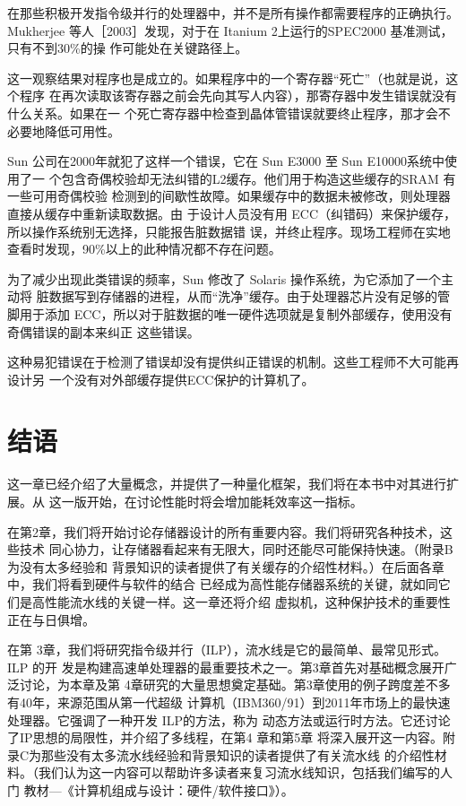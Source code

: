 在那些积极开发指令级并行的处理器中，并不是所有操作都需要程序的正确执行。
Mukherjee 等人［2003］发现，对于在 Itanium 2上运行的SPEC2000 基准测试，只有不到30\%的操
作可能处在关键路径上。

这一观察结果对程序也是成立的。如果程序中的一个寄存器“死亡”（也就是说，这个程序
在再次读取该寄存器之前会先向其写人内容），那寄存器中发生错误就没有什么关系。如果在一
个死亡寄存器中检查到晶体管错误就要终止程序，那才会不必要地降低可用性。

Sun 公司在2000年就犯了这样一个错误，它在 Sun E3000 至 Sun E10000系统中使用了一
个包含奇偶校验却无法纠错的L2缓存。他们用于构造这些缓存的SRAM 有一些可用奇偶校验
检测到的间歇性故障。如果缓存中的数据未被修改，则处理器直接从缓存中重新读取数据。由
于设计人员没有用 ECC（纠错码）来保护缓存，所以操作系统别无选择，只能报告脏数据错
误，并终止程序。现场工程师在实地查看时发现，90\%以上的此种情况都不存在问题。

为了减少出现此类错误的频率，Sun 修改了 Solaris 操作系统，为它添加了一个主动将
脏数据写到存储器的进程，从而“洗净”缓存。由于处理器芯片没有足够的管脚用于添加
ECC，所以对于脏数据的唯一硬件选项就是复制外部缓存，使用没有奇偶错误的副本来纠正
这些错误。

这种易犯错误在于检测了错误却没有提供纠正错误的机制。这些工程师不大可能再设计另
一个没有对外部缓存提供ECC保护的计算机了。

\section{结语}
这一章已经介绍了大量概念，并提供了一种量化框架，我们将在本书中对其进行扩展。从
这一版开始，在讨论性能时将会增加能耗效率这一指标。

在第2章，我们将开始讨论存储器设计的所有重要内容。我们将研究各种技术，这些技术
同心协力，让存储器看起来有无限大，同时还能尽可能保持快速。（附录B 为没有太多经验和
背景知识的读者提供了有关缓存的介绍性材料。）在后面各章中，我们将看到硬件与软件的结合
已经成为高性能存储器系统的关键，就如同它们是高性能流水线的关键一样。这一章还将介绍
虚拟机，这种保护技术的重要性正在与日俱增。

在第 3章，我们将研究指令级并行（ILP），流水线是它的最简单、最常见形式。ILP 的开
发是构建高速单处理器的最重要技术之一。第3章首先对基础概念展开广泛讨论，为本章及第
4章研究的大量思想奠定基础。第3章使用的例子跨度差不多有40年，来源范围从第一代超级
计算机（IBM360/91）到2011年市场上的最快速处理器。它强调了一种开发 ILP的方法，称为
动态方法或运行时方法。它还讨论了IP思想的局限性，并介绍了多线程，在第4 章和第5章
将深入展开这一内容。附录C为那些没有太多流水线经验和背景知识的读者提供了有关流水线
的介绍性材料。（我们认为这一内容可以帮助许多读者来复习流水线知识，包括我们编写的人门
教材—《计算机组成与设计：硬件/软件接口》）。

